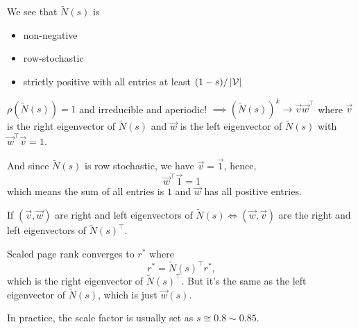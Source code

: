 \begin{note}
	We see that \(\widetilde{N}(s)\) is
	\begin{itemize}
		\item non-negative
		\item row-stochastic
		\item strictly positive with all entries at least \((1-s) / \left\vert \mathcal{\MakeUppercase{v}} \right\vert \)
	\end{itemize}
\end{note}
\(\rho(\widetilde{N}(s)) = 1\) and irreducible and aperiodic! \(\implies (\widetilde{N}(s))^k \to \vec{v}\vec{w}^{\top}\) where
\(\vec{v}\) is the right eigenvector of \(\widetilde{N}(s)\) and \(\vec{w}\) is the left eigenvector of \(\widetilde{N}(s)\) with
\(\vec{w}^{\top} \vec{v} = 1\).

And since \(\widetilde{N}(s)\) is row stochastic, we have \(\vec{v} = \vec{1}\), hence,
\[
	\vec{w}^{\top}\vec{1} = 1
\]
which means the sum of all entries is \(1\) and \(\vec{w}\) has all positive entries.

If \((\vec{v}, \vec{w})\) are right and left eigenvectors of \(\widetilde{N}(s) \iff (\vec{w}, \vec{v})\) are the right and left eigenvectors
of \(\widetilde{N}(s)^{\top}\).

\begin{remark}
	Scaled page rank converges to \(r^{\ast} \) where
	\[
		r^{\ast} = \widetilde{N}(s)^{\top}r^{\ast},
	\]
	which is the right eigenvector of \(\widetilde{N}(s)^{\top}\). But it's the same as the left eigenvector of \(\widetilde{N}(s)\), which is just
	\(\vec{w}(s)\).
\end{remark}

\begin{note}
	In practice, the scale factor is usually set as \(s \cong 0.8 \sim 0.85\).
\end{note}